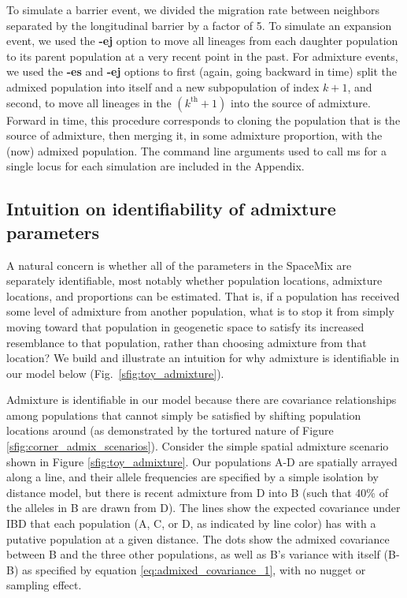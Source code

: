 \documentclass[12pt]{article}
\begin{document}
To simulate a barrier event, we divided the migration rate between neighbors separated by the longitudinal barrier by a factor of 5.  To simulate an expansion event, we used the \textbf{-ej} option to move all lineages from each daughter population to its parent population at a very recent point in the past.  For admixture events, we used the \textbf{-es} and \textbf{-ej} options to first (again, going backward in time) split the admixed population into itself and a new subpopulation of index $k + 1$, and second, to move all lineages in the $(k^{\text{th}} + 1)$ into the source of admixture.  Forward in time, this procedure corresponds to cloning the population that is the source of admixture, then merging it, in some admixture proportion, with the (now) admixed population.  The command line arguments used to call ms for a single locus for each simulation are included in the Appendix.


\subsection*{Intuition on identifiability of admixture parameters}
A natural concern is whether all of the parameters in the SpaceMix are separately identifiable, most notably whether population locations, admixture locations, and proportions can be estimated. That is, if a population has received some level of admixture from another population, what is to stop it from simply moving toward that population in geogenetic space to satisfy its increased resemblance to that population, rather than choosing admixture from that location?  We build and illustrate an intuition for why admixture is identifiable in our model below (Fig.\ \ref{sfig:toy_admixture}).

Admixture is identifiable in our model because there are covariance relationships among populations that cannot simply be satisfied by shifting population locations around (as demonstrated by the tortured nature of Figure \ref{sfig:corner_admix_scenarios}). Consider the simple spatial admixture scenario shown in Figure \ref{sfig:toy_admixture}. Our populations A-D are spatially arrayed  along a line, and their allele frequencies are specified by a simple isolation by distance model, but there is recent admixture from D into B (such that 40\% of the alleles in B are drawn from D).  The lines show the expected covariance under IBD that each population (A, C, or D, as indicated by line color) has with a putative population at a given distance.  The dots show the admixed covariance between B and the three other populations, as well as B's variance with itself (B-B) as specified by equation \eqref{eq:admixed_covariance_1}, with no nugget or sampling effect.
\end{document}
